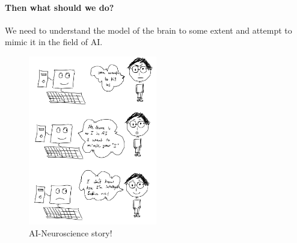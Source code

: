 \documentclass[%
 reprint,
 amsmath,amssymb,
 aps,
]{revtex4-2}
\begin{document}
\paragraph{\large Then what should we do?}
We need to understand the model of the brain to some extent and attempt to mimic it in the field of AI.
\begin{figure}[H]
    \centering
    \includegraphics[width=0.5\textwidth]{images/mimic_human.png}
    \caption{\label{mimic_human_ai} AI-Neuroscience story! }
\end{figure}
\end{document}
